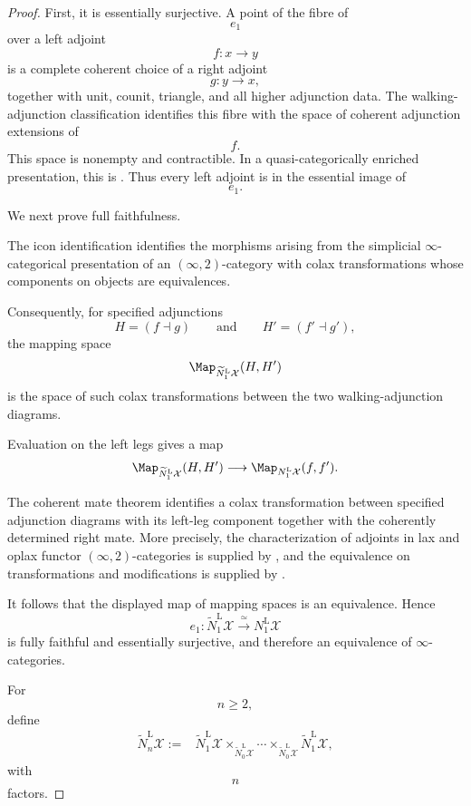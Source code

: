 \begin{proof}
First, it is essentially surjective. A point of the fibre of
\[
    e_1
\]
over a left adjoint
\[
    f
    \colon
    x
    \longrightarrow
    y
\]
is a complete coherent choice of a right adjoint
\[
    g
    \colon
    y
    \longrightarrow
    x,
\]
together with unit, counit, triangle, and all higher adjunction data.
The walking-adjunction classification identifies this fibre with the
space of coherent adjunction extensions of
\[
    f.
\]
This space is nonempty and contractible. In a quasi-categorically
enriched presentation, this is
\cite[Theorem~4.4.18]{RiehlVerityHomotopyCoherentAdjunctions}.
Thus every left adjoint is in the essential image of
\[
    e_1.
\]

We next prove full faithfulness.

The icon identification
\cite[Theorem~7.3]{HaugsengLaxTransformations}
identifies the morphisms arising from the simplicial
$\infty$-categorical presentation of an $(\infty,2)$-category with
colax transformations whose components on objects are equivalences.

Consequently, for specified adjunctions
\[
    H
    =
    (f\dashv g)
    \qquad\text{and}\qquad
    H'
    =
    (f'\dashv g'),
\]
the mapping space
\[
    \Map_{\widetilde N_1^{\mathrm L}\mathcal X}(H,H')
\]
is the space of such colax transformations between the two
walking-adjunction diagrams.

Evaluation on the left legs gives a map
\[
\begin{aligned}
    \Map_{\widetilde N_1^{\mathrm L}\mathcal X}(H,H')
    \longrightarrow
    \Map_{N_1^{\mathrm L}\mathcal X}(f,f').
\end{aligned}
\]

The coherent mate theorem identifies a colax transformation between
specified adjunction diagrams with its left-leg component together with
the coherently determined right mate. More precisely, the
characterization of adjoints in lax and oplax functor
$(\infty,2)$-categories is supplied by
\cite[Corollary~5.2.10]{AbellanGagnaHaugsengMates},
and the equivalence on transformations and modifications is supplied by
\cite[Theorem~5.3.6]{AbellanGagnaHaugsengMates}.

It follows that the displayed map of mapping spaces is an equivalence.
Hence
\[
    e_1
    \colon
    \widetilde N_1^{\mathrm L}\mathcal X
    \xrightarrow{\;\simeq\;}
    N_1^{\mathrm L}\mathcal X
\]
is fully faithful and essentially surjective, and therefore an
equivalence of $\infty$-categories.

For
\[
    n\geq 2,
\]
define
\[
\begin{aligned}
    \widetilde N_n^{\mathrm L}\mathcal X
    :={}&
    \widetilde N_1^{\mathrm L}\mathcal X
    \times_{\widetilde N_0^{\mathrm L}\mathcal X}
    \cdots
    \times_{\widetilde N_0^{\mathrm L}\mathcal X}
    \widetilde N_1^{\mathrm L}\mathcal X,
\end{aligned}
\]
with
\[
    n
\]
factors.


\end{proof}
